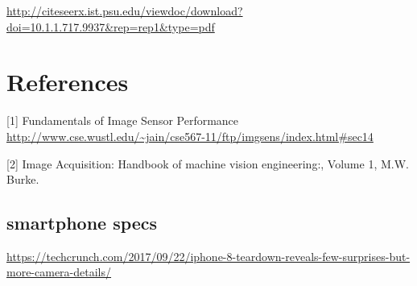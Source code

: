 \documentclass{article}
\begin{document}
\url{http://citeseerx.ist.psu.edu/viewdoc/download?doi=10.1.1.717.9937&rep=rep1&type=pdf}


\section{References}
[1] Fundamentals of Image Sensor Performance \url{http://www.cse.wustl.edu/~jain/cse567-11/ftp/imgsens/index.html#sec14}

[2] Image Acquisition: Handbook of machine vision engineering:, Volume 1, M.W. Burke.
\subsection{smartphone specs}
\url{https://techcrunch.com/2017/09/22/iphone-8-teardown-reveals-few-surprises-but-more-camera-details/}
\end{document}
